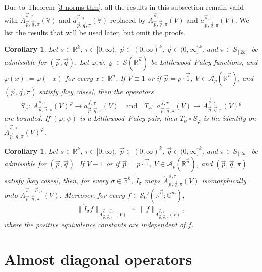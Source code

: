\documentclass[11pt, reqno]{amsart}
\newtheorem{corollary}[theorem]{Corollary}
\theoremstyle{definition}
\theoremstyle{remark}
\numberwithin{equation}{section}
\newcommand{\A}{\mathscr A}
\newcommand{\C}{\mathbb C}
\newcommand{\R}{\mathbb R}
\newcommand{\Sc}{\mathscr S}
\newcommand{\V}{\mathbb V}
\newcommand{\vn}{\vec n}
\newcommand{\vp}{\vec p}
\newcommand{\vq}{\vec q}
\newcommand{\vs}{\vec s}
\newcommand{\Atau}{\dot A^{\vs,\tau}_{\vp,\vq,\pi}}
\newcommand{\atau}{\dot a^{\vs,\tau}_{\vp,\vq,\pi}}
\begin{document}
Due to Theorem \ref{3 norms thm},
all the results in this subsection
remain valid with $\Atau(\V)$ and $\atau(\V)$ replaced by $\Atau(V)$ and $\atau(V)$.
We list the results that will be used later, but omit the proofs.

\begin{corollary}\label{phiV}
Let $s\in\R^k$, $\tau\in[0,\infty)$, $\vp\in(0,\infty)^k$, $\vq\in(0,\infty]^k$, and $\pi\in S_{[2k]}$ be admissible for $(\vp,\vq)$.
Let $\varphi,\psi,\varrho\in\Sc (\R^{\vn})$ be Littlewood--Paley functions, and $\widetilde\varphi(x):=\overline{\varphi(-x)}$ for every $x\in\mathbb{R}^n$.
If $V\equiv1$ or if $\vp=p\cdot\vec 1$, $V\in \A_p(\R^{\vn})$,
and $(\vp,\vq,\pi)$ satisfy \eqref{key cases},
then the operators
\begin{equation*}
S_\varphi:\ \Atau(V)^{\widetilde{\varphi}}\to\atau(V)
\quad\text{and}\quad
T_\psi:\ \atau(V)\to \Atau(V)^{\varrho}
\end{equation*}
are bounded.
If $(\varphi,\psi)$ is a Littlewood--Paley pair, then
$T_\psi\circ S_\varphi$ is the identity on $\Atau(V)^{\widetilde{\varphi}}$.
\end{corollary}

\begin{corollary}\label{257V}
Let $s\in\R^k$, $\tau\in[0,\infty)$, $\vp\in(0,\infty)^k$, $\vq\in(0,\infty]^k$, and $\pi\in S_{[2k]}$ be admissible for $(\vp,\vq)$.
If $V\equiv1$ or if $\vp=p\cdot\vec 1$, $V\in \A_p(\R^{\vn})$,
and $(\vp,\vq,\pi)$ satisfy \eqref{key cases},
then, for every $\sigma\in\R^k$, $\dot I_\sigma$ maps $\dot A_{\vec p,\vec q,\pi}^{\vec s,\tau}(V)$ isomorphically onto $\dot A_{\vec p,\vec q,\pi}^{\vec s+\vec \sigma,\tau}(V)$.
Moreover, for every $f\in\mathscr{S}_0'(\mathbb R^{\vec n};\C^m)$,
$$
\|\dot I_\sigma f\|_{\dot A_{\vec p,\vec q,\pi}^{\vec s+\vec \sigma,\tau}(V)}
\sim \|f\|_{\dot A_{\vec p,\vec q,\pi}^{\vec s,\tau}(V)},
$$
where the positive equivalence constants are independent of $f$.
\end{corollary}

\section{Almost diagonal operators}\label{sec AD}
\end{document}
